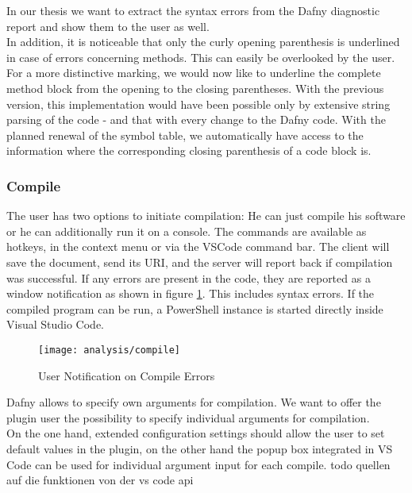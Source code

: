 In our thesis we want to extract the syntax errors from the Dafny diagnostic report and show them to the user as well.
  \\

In addition, it is noticeable that only the curly opening parenthesis is underlined in case of errors concerning methods.
This can easily be overlooked by the user.
For a more distinctive marking, we would now like to underline the complete method block from the opening to the closing parentheses.
With the previous version, this implementation would have been possible only by extensive string parsing of the code - and that with every change to the Dafny code.
With the planned renewal of the symbol table, we automatically have access to the information where the corresponding closing parenthesis of a code block is.

\subsubsection{Compile}
The user has two options to initiate compilation: He can just compile his software or he can additionally run it on a console. The commands are available as hotkeys, in the context menu or via the VSCode command bar. The client will save the document, send its URI, and the server will report back if compilation was successful. If any errors are present in the code, they are reported as a window notification as shown in figure \ref{fig:analysis_compile}. This includes syntax errors. If the compiled program can be run, a PowerShell instance is started directly inside Visual Studio Code.

\begin{figure}[H]
    \centering
    \texttt{[image: analysis/compile]}
    \caption{User Notification on Compile Errors}
    \label{fig:analysis_compile}
\end{figure}

Dafny allows to specify own arguments for compilation.
We want to offer the plugin user the possibility to specify individual arguments for compilation. \\

On the one hand, extended configuration settings should allow the user to set default values in the plugin, on the other hand the popup box integrated in VS Code can be used for individual argument input for each compile.
todo quellen auf die funktionen von der vs code api

